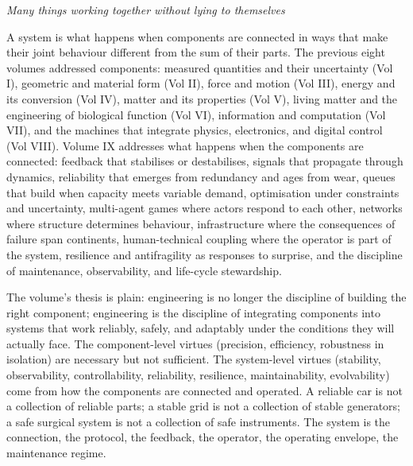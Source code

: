 
\vspace*{1.5cm}
\begin{center}
\itshape\large
Many things working together without lying to themselves
\end{center}
\vspace{0.5cm}

\noindent
A system is what happens when components are connected in ways that make their joint behaviour different from the sum of their parts. The previous eight volumes addressed components: measured quantities and their uncertainty (Vol I), geometric and material form (Vol II), force and motion (Vol III), energy and its conversion (Vol IV), matter and its properties (Vol V), living matter and the engineering of biological function (Vol VI), information and computation (Vol VII), and the machines that integrate physics, electronics, and digital control (Vol VIII). Volume IX addresses what happens when the components are connected: feedback that stabilises or destabilises, signals that propagate through dynamics, reliability that emerges from redundancy and ages from wear, queues that build when capacity meets variable demand, optimisation under constraints and uncertainty, multi-agent games where actors respond to each other, networks where structure determines behaviour, infrastructure where the consequences of failure span continents, human-technical coupling where the operator is part of the system, resilience and antifragility as responses to surprise, and the discipline of maintenance, observability, and life-cycle stewardship.

The volume's thesis is plain: engineering is no longer the discipline of building the right component; engineering is the discipline of integrating components into systems that work reliably, safely, and adaptably under the conditions they will actually face. The component-level virtues (precision, efficiency, robustness in isolation) are necessary but not sufficient. The system-level virtues (stability, observability, controllability, reliability, resilience, maintainability, evolvability) come from how the components are connected and operated. A reliable car is not a collection of reliable parts; a stable grid is not a collection of stable generators; a safe surgical system is not a collection of safe instruments. The system is the connection, the protocol, the feedback, the operator, the operating envelope, the maintenance regime.

